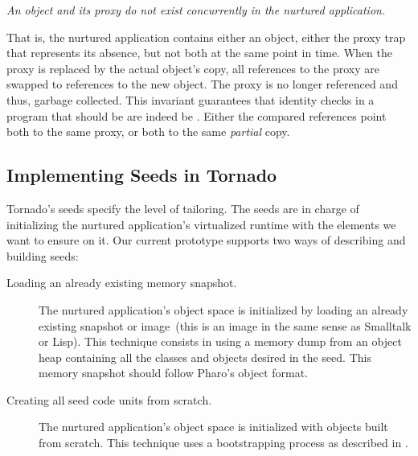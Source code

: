 \begin{center}\emph{An object and its proxy do not exist concurrently in the nurtured application.}\end{center}

That is, the nurtured application contains either an object, either the proxy trap that represents its absence, but not both at the same point in time. When the proxy is replaced by the actual object's copy, all references to the proxy are swapped to references to the new object. The proxy is no longer referenced and thus, garbage collected. This invariant guarantees that identity checks in a program that should be  are indeed be . Either the compared references point both to the same proxy, or both to the same \emph{partial} copy.

\subsection{Implementing Seeds in Tornado}

Tornado's seeds specify the level of tailoring. The seeds are in charge of initializing the nurtured application's virtualized runtime with the elements we want to ensure on it. Our current prototype supports two ways of describing and building seeds: 

\begin{description}
\item[Loading an already existing memory snapshot.] The nurtured application's object space is initialized by loading an already existing snapshot or image~(\ie this is an image in the same sense as Smalltalk or Lisp). This technique consists in using a memory dump from an object heap containing all the classes and objects desired in the seed. This memory snapshot should follow Pharo's object format. 
\item[Creating all seed code units from scratch.] The nurtured application's object space is initialized with objects built from scratch. This technique uses a bootstrapping process as described in .
\end{description}


